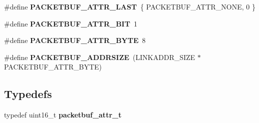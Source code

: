 \begin{DoxyCompactItemize}
\item 
\hypertarget{group__packetbuf_ga6e9533a0217db95b301b8a527257663c}{}\#define {\bfseries P\+A\+C\+K\+E\+T\+B\+U\+F\+\_\+\+A\+T\+T\+R\+\_\+\+L\+A\+S\+T}~\{ P\+A\+C\+K\+E\+T\+B\+U\+F\+\_\+\+A\+T\+T\+R\+\_\+\+N\+O\+N\+E, 0 \}\label{group__packetbuf_ga6e9533a0217db95b301b8a527257663c}

\item 
\hypertarget{group__packetbuf_ga86f084560f6b26e9e963522efb10662b}{}\#define {\bfseries P\+A\+C\+K\+E\+T\+B\+U\+F\+\_\+\+A\+T\+T\+R\+\_\+\+B\+I\+T}~1\label{group__packetbuf_ga86f084560f6b26e9e963522efb10662b}

\item 
\hypertarget{group__packetbuf_gaf067f809891ee0b0b9aae3dd09777456}{}\#define {\bfseries P\+A\+C\+K\+E\+T\+B\+U\+F\+\_\+\+A\+T\+T\+R\+\_\+\+B\+Y\+T\+E}~8\label{group__packetbuf_gaf067f809891ee0b0b9aae3dd09777456}

\item 
\hypertarget{group__packetbuf_ga04a0145df4d55cce9a5331f51a4b9b25}{}\#define {\bfseries P\+A\+C\+K\+E\+T\+B\+U\+F\+\_\+\+A\+D\+D\+R\+S\+I\+Z\+E}~(L\+I\+N\+K\+A\+D\+D\+R\+\_\+\+S\+I\+Z\+E $\ast$ P\+A\+C\+K\+E\+T\+B\+U\+F\+\_\+\+A\+T\+T\+R\+\_\+\+B\+Y\+T\+E)\label{group__packetbuf_ga04a0145df4d55cce9a5331f51a4b9b25}

\end{DoxyCompactItemize}
\subsection*{Typedefs}
\begin{DoxyCompactItemize}
\item 
\hypertarget{group__packetbuf_gae41466452329cdd6c9bf33ee579b9590}{}typedef uint16\+\_\+t {\bfseries packetbuf\+\_\+attr\+\_\+t}\label{group__packetbuf_gae41466452329cdd6c9bf33ee579b9590}

\end{DoxyCompactItemize}
